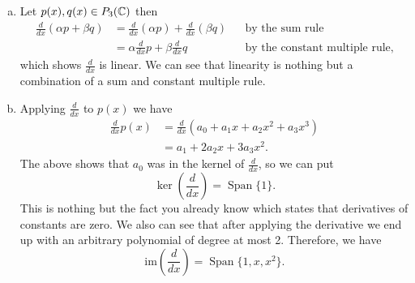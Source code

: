 \documentclass[12pt]{article} %
\newcommand{\Span}{\operatorname{Span}}
\begin{document}
\begin{solution}
\begin{enumerate}[(a)]
    \item Let $p(x), q(x) \in P_3(\mathbb{C})$ then
    \begin{align*}
        \frac{d}{dx}(\alpha p+\beta q) &= \frac{d}{dx}(\alpha p) + \frac{d}{dx}(\beta q) && \textrm{by the sum rule}\\
        &= \alpha \frac{d}{dx}p + \beta \frac{d}{dx}q && \textrm{by the constant multiple rule},
    \end{align*}
    which shows $\frac{d}{dx}$ is linear. We can see that linearity is nothing but a combination of a sum and constant multiple rule.
    \item Applying $\frac{d}{dx}$ to $p(x)$ we have
    \begin{align*}
        \frac{d}{dx} p(x) &=\frac{d}{dx}( a_0 + a_1 x + a_2 x^2 + a_3 x^3)\\
        &= a_1 + 2a_2x + 3 a_3x^2.
    \end{align*}
    The above shows that $a_0$ was in the kernel of $\frac{d}{dx}$, so we can put
    \[
    \ker\left(\frac{d}{dx}\right) = \Span\{1\}.
    \]
    This is nothing but the fact you already know which states that derivatives of constants are zero. We also can see that after applying the derivative we end up with an arbitrary polynomial of degree at most 2. Therefore, we have
    \[
    \mathrm{im}\left( \frac{d}{dx}\right) = \Span \{1,x,x^2\}.
    \]
\end{enumerate}
\end{solution}
\end{document}
